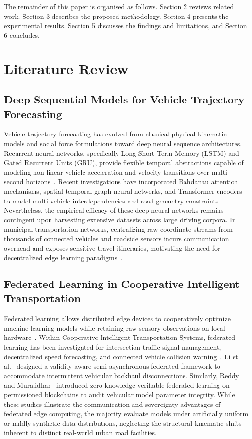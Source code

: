 \documentclass[journal]{IEEEtran}
\begin{document}
The remainder of this paper is organised as follows. Section 2 reviews related work. Section 3 describes the proposed methodology. Section 4 presents the experimental results. Section 5 discusses the findings and limitations, and Section 6 concludes.

\section{Literature Review}
\label{sec:literature}

\subsection{Deep Sequential Models for Vehicle Trajectory Forecasting}
Vehicle trajectory forecasting has evolved from classical physical kinematic models and social force formulations toward deep neural sequence architectures. Recurrent neural networks, specifically Long Short-Term Memory (LSTM) and Gated Recurrent Units (GRU), provide flexible temporal abstractions capable of modeling non-linear vehicle acceleration and velocity transitions over multi-second horizons~\cite{crivellari2026federated,mundada2026federated}. Recent investigations have incorporated Bahdanau attention mechanisms, spatial-temporal graph neural networks, and Transformer encoders to model multi-vehicle interdependencies and road geometry constraints~\cite{zhao2026digitaltwin,qi2023fedagcn}. Nevertheless, the empirical efficacy of these deep neural networks remains contingent upon harvesting extensive datasets across large driving corpora. In municipal transportation networks, centralizing raw coordinate streams from thousands of connected vehicles and roadside sensors incurs communication overhead and exposes sensitive travel itineraries, motivating the need for decentralized edge learning paradigms~\cite{ni2024federated,zhang2022communication}.

\subsection{Federated Learning in Cooperative Intelligent Transportation}
Federated learning allows distributed edge devices to cooperatively optimize machine learning models while retaining raw sensory observations on local hardware~\cite{mcmahan2017communication}. Within Cooperative Intelligent Transportation Systems, federated learning has been investigated for intersection traffic signal management, decentralized speed forecasting, and connected vehicle collision warning~\cite{meese2024adaptive,liu2025trajectory}. Li et al.~\cite{li2024vsfl} designed a validity-aware semi-asynchronous federated framework to accommodate intermittent vehicular backhaul disconnections. Similarly, Reddy and Muralidhar~\cite{reddy2026zero} introduced zero-knowledge verifiable federated learning on permissioned blockchains to audit vehicular model parameter integrity. While these studies illustrate the communication and sovereignty advantages of federated edge computing, the majority evaluate models under artificially uniform or mildly synthetic data distributions, neglecting the structural kinematic shifts inherent to distinct real-world urban road facilities.
\end{document}
